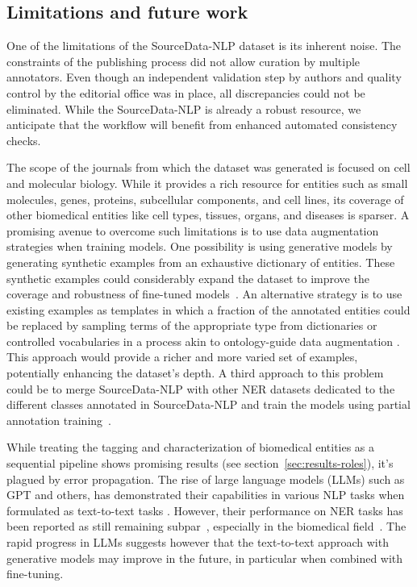 \documentclass{bioinfo}
\begin{document}
\subsection{Limitations and future work}\label{sec:future} 

One of the limitations of the SourceData-NLP dataset is its inherent noise. The constraints of the publishing process did not allow curation by multiple annotators. Even though an independent validation step by authors and quality control by the editorial office was in place, all discrepancies could not be eliminated. While the SourceData-NLP is already a robust resource, we anticipate that the workflow will benefit from enhanced automated consistency checks.

The scope of the journals from which the dataset was generated is focused on cell and molecular biology. While it provides a rich resource for entities such as small molecules, genes, proteins, subcellular components, and cell lines, its coverage of other biomedical entities like cell types, tissues, organs, and diseases is sparser. A promising avenue to overcome such limitations is to use data augmentation strategies when training models. One possibility is using generative models by generating synthetic examples from an exhaustive dictionary of entities. These synthetic examples could considerably expand the dataset to improve the coverage and robustness of fine-tuned models~\citep[e.g., ][]{guo2023improving,whitehouse2023llmpowered,yuan2023large}. An alternative strategy is to use existing examples as templates in which a fraction of the annotated entities could be replaced by sampling terms of the appropriate type from dictionaries or controlled vocabularies in a process akin to ontology-guide data augmentation \citep{Abdollahi2020OntologyGuidedDA}. This approach would provide a richer and more varied set of examples, potentially enhancing the dataset's depth. A third approach to this problem could be to merge SourceData-NLP with other NER datasets dedicated to the different classes annotated in SourceData-NLP and train the models using partial annotation training~\citep{Ding2023PartialAL}.

While treating the tagging and characterization of biomedical entities as a sequential pipeline shows promising results (see section~\ref{sec:results-roles}), it's plagued by error propagation. The rise of large language models (LLMs) such as GPT and others, has demonstrated their capabilities in various NLP tasks when formulated as text-to-text tasks \citep{t5}. However, their performance on NER tasks has been reported as still remaining subpar~\citep{jimenez22}, especially in the biomedical field~\citep{deusser2023informed}. The rapid progress in LLMs suggests however that the text-to-text approach with generative models may improve in the future, in particular when combined with fine-tuning. 
\end{document}
